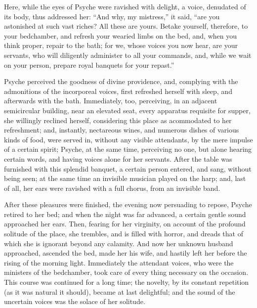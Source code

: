 \documentclass{article}
\begin{document}
Here, while the eyes of Psyche were ravished with delight, a voice, denudated
of its body, thus addressed her: ``And why, my mistress,'' it said, ``are you
astonished at such vast riches? All these are yours. Betake yourself,
therefore, to your bedchamber, and refresh your wearied limbs on the bed, and,
when you think proper, repair to the bath; for we, whose voices you now hear,
are your servants, who will diligently administer to all your commands, and,
while we wait on your person, prepare royal banquets for your repast.''

Psyche perceived the goodness of divine providence, and, complying with the
admonitions of the incorporeal voices, first refreshed herself with sleep, and
afterwards with the bath. Immediately, too, perceiving, in an adjacent
semicircular building, near an elevated seat, every apparatus requisite for
supper, she willingly reclined herself, considering this place as acommodated
to her refreshment; and, instantly, nectareous wines, and numerous dishes of
various kinds of food, were served in, without any visible attendants, by the
mere impulse of a certain spirit; Psyche, at the same time, perceiving no one,
but alone hearing certain words, and having voices alone for her servants.
After the table was furnished with this splendid banquet, a certain person
entered, and sang, without being seen; at the same time an invisible musician
played on the harp; and, last of all, her ears were ravished with a full
chorus, from an invisible band.

After these pleasures were finished, the evening now persuading to repose,
Psyche retired to her bed; and when the night was far advanced, a certain
gentle sound approached her ears. Then, fearing for her virginity, on account
of the profound solitude of the place, she trembles, and is filled with horror,
and dreads that of which she is ignorant beyond any calamity. And now her
unknown husband approached, ascended the bed, made her his wife, and hastily
left her before the rising of the morning light. Immediately the attendant
voices, who were the ministers of the bedchamber, took care of every thing
necessary on the occasion. This course was continued for a long time; the
novelty, by its constant repetition (as it was natural it should), became at
last delightful; and the sound of the uncertain voices was the solace of her
solitude.
\end{document}
